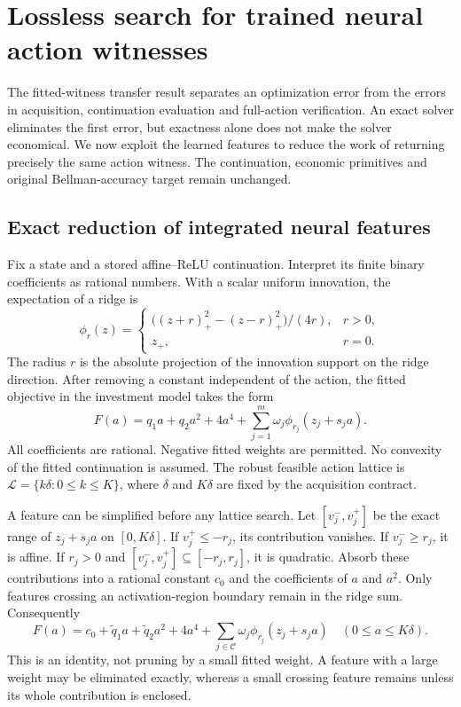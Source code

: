 \section{Lossless search for trained neural action witnesses}\label{sec:lossless59}
The fitted-witness transfer result separates an optimization error from the errors in acquisition, continuation evaluation and full-action verification. An exact solver eliminates the first error, but exactness alone does not make the solver economical. We now exploit the learned features to reduce the work of returning precisely the same action witness. The continuation, economic primitives and original Bellman-accuracy target remain unchanged.

\subsection{Exact reduction of integrated neural features}
Fix a state and a stored affine--ReLU continuation. Interpret its finite binary coefficients as rational numbers. With a scalar uniform innovation, the expectation of a ridge is
\[
 \phi_r(z)=\begin{cases}
 \bigl((z+r)_+^2-(z-r)_+^2\bigr)/(4r),&r>0,\\
 z_+,&r=0.
 \end{cases}
\]
The radius $r$ is the absolute projection of the innovation support on the ridge direction. After removing a constant independent of the action, the fitted objective in the investment model takes the form
\begin{equation}\label{eq:ridge-objective59}
 F(a)=q_1a+q_2a^2+4a^4+
       \sum_{j=1}^{m}\omega_j\phi_{r_j}(z_j+s_ja).
\end{equation}
All coefficients are rational. Negative fitted weights are permitted. No convexity of the fitted continuation is assumed. The robust feasible action lattice is $\mathcal L=\{k\delta:0\leq k\leq K\}$, where $\delta$ and $K\delta$ are fixed by the acquisition contract.

A feature can be simplified before any lattice search. Let $[v_j^-,v_j^+]$ be the exact range of $z_j+s_ja$ on $[0,K\delta]$. If $v_j^+\leq-r_j$, its contribution vanishes. If $v_j^-\geq r_j$, it is affine. If $r_j>0$ and $[v_j^-,v_j^+]\subseteq[-r_j,r_j]$, it is quadratic. Absorb these contributions into a rational constant $c_0$ and the coefficients of $a$ and $a^2$. Only features crossing an activation-region boundary remain in the ridge sum. Consequently
\begin{equation}\label{eq:exact-reduction59}
 F(a)=c_0+\widetilde q_1a+\widetilde q_2a^2+4a^4+
        \sum_{j\in\mathcal C}\omega_j\phi_{r_j}(z_j+s_ja)
 \quad(0\leq a\leq K\delta).
\end{equation}
This is an identity, not pruning by a small fitted weight. A feature with a large weight may be eliminated exactly, whereas a small crossing feature remains unless its whole contribution is enclosed.

